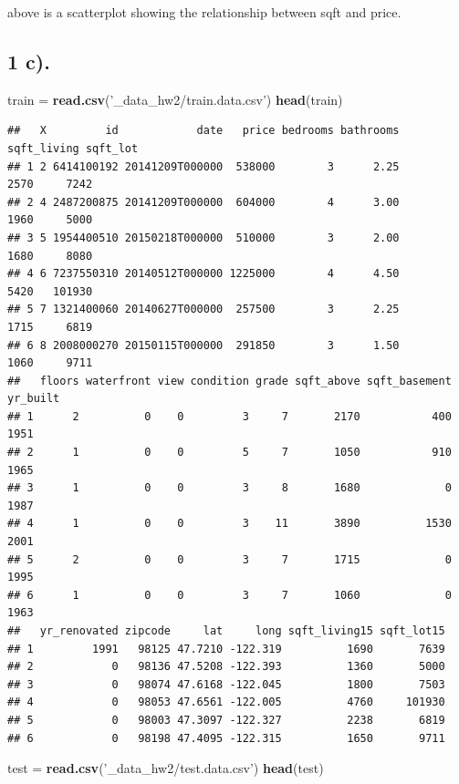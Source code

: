 \documentclass[
]{article}
\newenvironment{Shaded}{\begin{snugshade}}{\end{snugshade}}
\newcommand{\KeywordTok}[1]{\textcolor[rgb]{0.13,0.29,0.53}{\textbf{#1}}}
\newcommand{\NormalTok}[1]{#1}
\newcommand{\StringTok}[1]{\textcolor[rgb]{0.31,0.60,0.02}{#1}}
\begin{document}
above is a scatterplot showing the relationship between sqft and price.

\hypertarget{c.}{%
\subsection{1 c).}\label{c.}}

\begin{Shaded}
\begin{Highlighting}[]
\NormalTok{train =}\StringTok{ }\KeywordTok{read.csv}\NormalTok{(}\StringTok{'_data_hw2/train.data.csv'}\NormalTok{)}
\KeywordTok{head}\NormalTok{(train)}
\end{Highlighting}
\end{Shaded}

\begin{verbatim}
##   X         id            date   price bedrooms bathrooms sqft_living sqft_lot
## 1 2 6414100192 20141209T000000  538000        3      2.25        2570     7242
## 2 4 2487200875 20141209T000000  604000        4      3.00        1960     5000
## 3 5 1954400510 20150218T000000  510000        3      2.00        1680     8080
## 4 6 7237550310 20140512T000000 1225000        4      4.50        5420   101930
## 5 7 1321400060 20140627T000000  257500        3      2.25        1715     6819
## 6 8 2008000270 20150115T000000  291850        3      1.50        1060     9711
##   floors waterfront view condition grade sqft_above sqft_basement yr_built
## 1      2          0    0         3     7       2170           400     1951
## 2      1          0    0         5     7       1050           910     1965
## 3      1          0    0         3     8       1680             0     1987
## 4      1          0    0         3    11       3890          1530     2001
## 5      2          0    0         3     7       1715             0     1995
## 6      1          0    0         3     7       1060             0     1963
##   yr_renovated zipcode     lat     long sqft_living15 sqft_lot15
## 1         1991   98125 47.7210 -122.319          1690       7639
## 2            0   98136 47.5208 -122.393          1360       5000
## 3            0   98074 47.6168 -122.045          1800       7503
## 4            0   98053 47.6561 -122.005          4760     101930
## 5            0   98003 47.3097 -122.327          2238       6819
## 6            0   98198 47.4095 -122.315          1650       9711
\end{verbatim}

\begin{Shaded}
\begin{Highlighting}[]
\NormalTok{test =}\StringTok{ }\KeywordTok{read.csv}\NormalTok{(}\StringTok{'_data_hw2/test.data.csv'}\NormalTok{)}
\KeywordTok{head}\NormalTok{(test)}
\end{Highlighting}
\end{Shaded}
\end{document}
